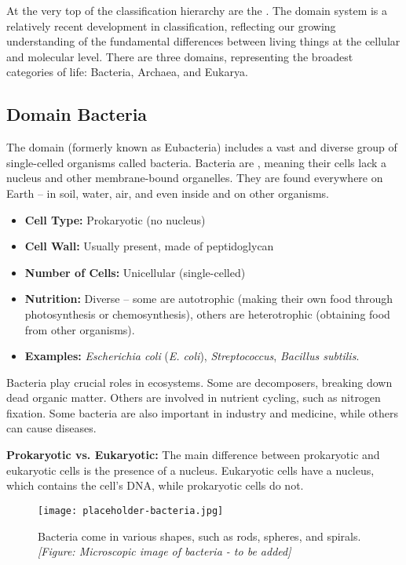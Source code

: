 At the very top of the classification hierarchy are the .  The domain system is a relatively recent development in classification, reflecting our growing understanding of the fundamental differences between living things at the cellular and molecular level.  There are three domains, representing the broadest categories of life: Bacteria, Archaea, and Eukarya.

\subsection{Domain Bacteria}

The domain  (formerly known as Eubacteria) includes a vast and diverse group of single-celled organisms called bacteria.  Bacteria are , meaning their cells lack a nucleus and other membrane-bound organelles.  They are found everywhere on Earth – in soil, water, air, and even inside and on other organisms.

\begin{itemize}
    \item \textbf{Cell Type:} Prokaryotic (no nucleus)
    \item \textbf{Cell Wall:} Usually present, made of peptidoglycan
    \item \textbf{Number of Cells:} Unicellular (single-celled)
    \item \textbf{Nutrition:}  Diverse – some are autotrophic (making their own food through photosynthesis or chemosynthesis), others are heterotrophic (obtaining food from other organisms).
    \item \textbf{Examples:} \textit{Escherichia coli} (\textit{E. coli}), \textit{Streptococcus}, \textit{Bacillus subtilis}.
\end{itemize}

Bacteria play crucial roles in ecosystems. Some are decomposers, breaking down dead organic matter. Others are involved in nutrient cycling, such as nitrogen fixation.  Some bacteria are also important in industry and medicine, while others can cause diseases.

\begin{marginnote}
\textbf{Prokaryotic vs. Eukaryotic:}  The main difference between prokaryotic and eukaryotic cells is the presence of a nucleus. Eukaryotic cells have a nucleus, which contains the cell's DNA, while prokaryotic cells do not.
\end{marginnote}

\begin{figure}
\centering
\texttt{[image: placeholder-bacteria.jpg]}
\caption{Bacteria come in various shapes, such as rods, spheres, and spirals. \textit{[Figure: Microscopic image of bacteria - to be added]}}
\end{figure}


